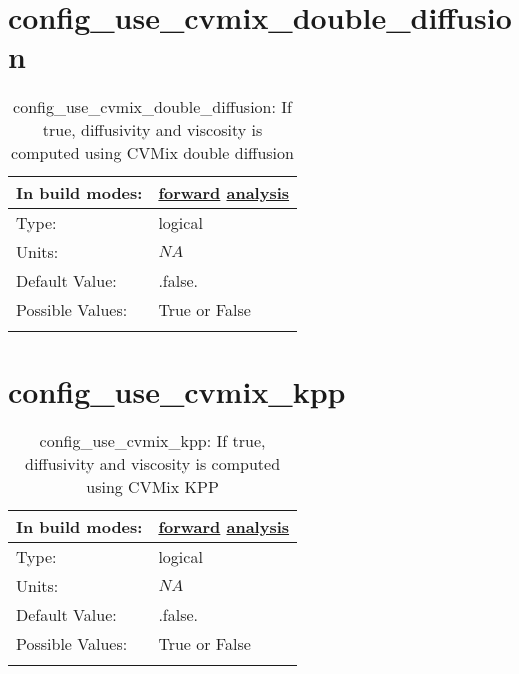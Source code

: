 \section[config\_use\_cvmix\_double\_diffusion]{config\_use\_cvmix\_double\_diffusion}
\label{sec:nm_sec_config_use_cvmix_double_diffusion}
\begin{center}
\begin{longtable}{| p{2.0in} || p{4.0in} |}
    \hline
    In build modes: & \hyperref[subsec:forward_nm_tab_cvmix]{forward} \hyperref[subsec:analysis_nm_tab_cvmix]{analysis} \\
    \hline
    Type: & logical \\
    \hline
    Units: & $NA$ \\
    \hline
    Default Value: & .false. \\
    \hline
    Possible Values: & True or False \\
    \hline
    \caption{config\_use\_cvmix\_double\_diffusion: If true, diffusivity and viscosity is computed using CVMix double diffusion}
\end{longtable}
\end{center}
\section[config\_use\_cvmix\_kpp]{config\_use\_cvmix\_kpp}
\label{sec:nm_sec_config_use_cvmix_kpp}
\begin{center}
\begin{longtable}{| p{2.0in} || p{4.0in} |}
    \hline
    In build modes: & \hyperref[subsec:forward_nm_tab_cvmix]{forward} \hyperref[subsec:analysis_nm_tab_cvmix]{analysis} \\
    \hline
    Type: & logical \\
    \hline
    Units: & $NA$ \\
    \hline
    Default Value: & .false. \\
    \hline
    Possible Values: & True or False \\
    \hline
    \caption{config\_use\_cvmix\_kpp: If true, diffusivity and viscosity is computed using CVMix KPP}
\end{longtable}
\end{center}
